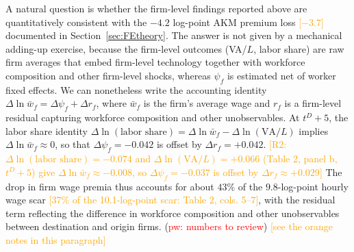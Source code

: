 \label{par:accounting_consistency}A natural question is whether the firm-level findings reported above are quantitatively consistent with the $-4.2$ log-point AKM premium loss \textcolor{orange}{[$-3.7$]} documented in Section~\ref{sec:FEtheory}. The answer is not given by a mechanical adding-up exercise, because the firm-level outcomes (VA/$L$, labor share) are raw firm averages that embed firm-level technology together with workforce composition and other firm-level shocks, whereas $\psi_f$ is estimated net of worker fixed effects. We can nonetheless write the accounting identity $\Delta \ln \bar{w}_f = \Delta \psi_f + \Delta r_f$, where $\bar{w}_f$ is the firm's average wage and $r_f$ is a firm-level residual capturing workforce composition and other unobservables. At $t^D+5$, the labor share identity $\Delta \ln(\text{labor share}) = \Delta \ln \bar{w}_f - \Delta \ln(\text{VA}/L)$ implies $\Delta \ln \bar{w}_f \approx 0$, so that $\Delta \psi_f = -0.042$ is offset by $\Delta r_f = +0.042$. \textcolor{orange}{[R2: $\Delta\ln(\text{labor share}) = -0.074$ and $\Delta\ln(\text{VA}/L) = +0.066$ (Table 2, panel b, $t^D+5$) give $\Delta \ln \bar{w}_f \approx -0.008$, so $\Delta \psi_f = -0.037$ is offset by $\Delta r_f \approx +0.029$]} The drop in firm wage premia thus accounts for about $43\%$ of the $9.8$-log-point hourly wage scar \textcolor{orange}{[37\% of the 10.1-log-point scar: Table 2, cols. 5--7]}, with the residual term reflecting the difference in workforce composition and other unobservables between destination and origin firms. (\textcolor{red}{pw: numbers to review}) \textcolor{orange}{[see the orange notes in this paragraph]}

